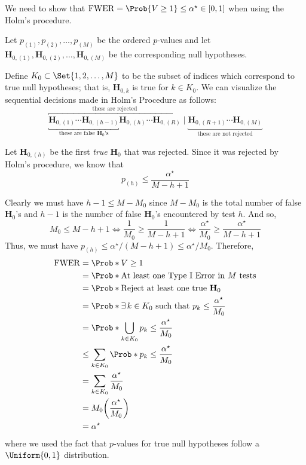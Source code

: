 We need to show that $ \FWER=\Prob{V\ge 1}\le \alpha^\star\in[0,1] $ when using the Holm's procedure.

Let $ p_{(1)},p_{(2)},\ldots,p_{(M)} $ be the ordered $ p $-values and let
$ \mathbf{H}_{0,(1)},\mathbf{H}_{0,(2)},\ldots,\mathbf{H}_{0,(M)} $ be the corresponding null hypotheses.

Define $ K_0\subset \Set{1,2,\ldots,M} $ to be the subset of indices which correspond
to true null hypotheses; that is, $ \mathbf{H}_{0,k} $ is true for $ k\in K_0 $.
We can visualize the sequential decisions made in Holm's Procedure as follows:
\[ \overbracket{\underbracket{\mathbf{H}_{0,(1)}\cdots\mathbf{H}_{0,(h-1)}}_{\text{these are false $\mathbf{H}_0$'s}}\mathbf{H}_{0,(h)}\cdots \mathbf{H}_{0,(R)}}^{\text{these are rejected}}\mid \underbracket{\mathbf{H}_{0,(R+1)}\cdots\mathbf{H}_{0,(M)}}_{\text{these are not rejected}} \]

Let $ \mathbf{H}_{0,(h)} $ be the first \emph{true} $ \mathbf{H}_0 $ that was rejected. Since it was rejected by Holm's procedure, we know that
\[ p_{(h)}\le \frac{\alpha^\star}{M-h+1} \]

Clearly we must have $ h-1\le M-M_0 $ since $ M-M_0 $ is the total number of false $ \mathbf{H}_0 $'s and $ h-1 $ is the number of false
$ \mathbf{H}_0 $'s encountered by test $ h $. And so,
\[
    M_0\le M-h+1
    \iff \frac{1}{M_0} \ge \frac{1}{M-h+1}
    \iff \frac{\alpha^\star}{M_0} \ge \frac{\alpha^\star}{M-h+1}
\]
Thus, we must have $ p_{(h)}\le \alpha^\star/(M-h+1)\le \alpha^\star/M_0 $. Therefore,
\begin{align*}
    \FWER
     & =\Prob*{V\ge 1}                                                              \\
     & =\Prob*{\text{At least one Type I Error in $M$ tests}}                       \\
     & =\Prob*{\text{Reject at least one true $\mathbf{H}_0$}}                      \\
     & =\Prob*{\exists\, k\in K_0\text{ such that }p_k\le \frac{\alpha^\star}{M_0}} \\
     & =\Prob*{\bigcup_{k\in K_0}p_k\le \frac{\alpha^\star}{M_0}}                   \\
     & \le \sum_{k\in K_0}\Prob*{p_k\le \frac{\alpha^\star}{M_0}}                   \\
     & =\sum_{k\in K_0}\frac{\alpha^\star}{M_0}                                     \\
     & =M_0\biggl(\frac{\alpha^\star}{M_0}\biggr)                                   \\
     & =\alpha^\star
\end{align*}
where we used the fact that $ p $-values for true null hypotheses follow a $ \Uniform{0,1} $ distribution.

